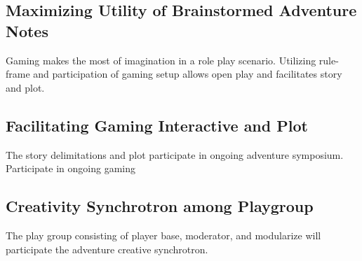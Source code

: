 \documentclass{article}
\begin{document}
\subsection{Maximizing Utility of Brainstormed Adventure Notes}
Gaming makes the most of imagination in a role play scenario. Utilizing rule-frame and participation of gaming setup allows open play and facilitates story and plot. 

\subsection*{Facilitating Gaming Interactive and Plot}
The story delimitations and plot participate in ongoing adventure symposium.
Participate in ongoing gaming

\subsection*{Creativity Synchrotron among Playgroup}
The play group consisting of player base, moderator, and modularize will participate the adventure creative synchrotron.
\end{document}
